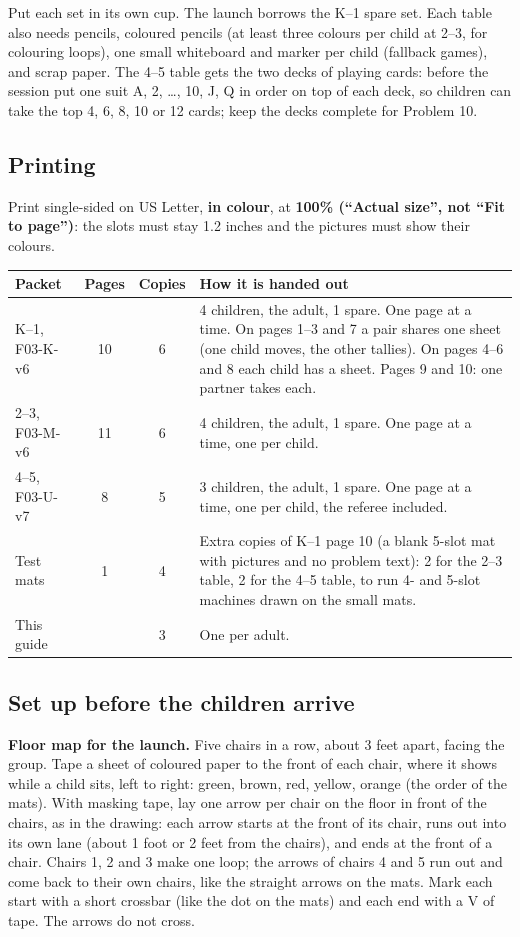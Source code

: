 \documentclass[11pt,letterpaper]{extarticle}
\begin{document}
Put each set in its own cup. The launch borrows the K--1 spare set. Each table also needs pencils, coloured pencils (at least three colours per child at 2--3, for colouring loops), one small whiteboard and marker per child (fallback games), and scrap paper. The 4--5 table gets the two decks of playing cards: before the session put one suit A, 2, \dots, 10, J, Q in order on top of each deck, so children can take the top 4, 6, 8, 10 or 12 cards; keep the decks complete for Problem 10.

\subsection{Printing}
Print single-sided on US Letter, \textbf{in colour}, at \textbf{100\% (``Actual size'', not ``Fit to page'')}: the slots must stay 1.2 inches and the pictures must show their colours.

\begin{tabularx}{\linewidth}{@{}lccX@{}}
\textbf{Packet} & \textbf{Pages} & \textbf{Copies} & \textbf{How it is handed out}\\ \hline
K--1, F03-K-v6 & 10 & 6 & 4 children, the adult, 1 spare. One page at a time. On pages 1--3 and 7 a pair shares one sheet (one child moves, the other tallies). On pages 4--6 and 8 each child has a sheet. Pages 9 and 10: one partner takes each.\\
2--3, F03-M-v6 & 11 & 6 & 4 children, the adult, 1 spare. One page at a time, one per child.\\
4--5, F03-U-v7 & 8 & 5 & 3 children, the adult, 1 spare. One page at a time, one per child, the referee included.\\
Test mats & 1 & 4 & Extra copies of K--1 page 10 (a blank 5-slot mat with pictures and no problem text): 2 for the 2--3 table, 2 for the 4--5 table, to run 4- and 5-slot machines drawn on the small mats.\\
This guide & \pageref*{LastPage} & 3 & One per adult.\\
\end{tabularx}

\subsection{Set up before the children arrive}
\textbf{Floor map for the launch.} Five chairs in a row, about 3 feet apart, facing the group. Tape a sheet of coloured paper to the front of each chair, where it shows while a child sits, left to right: green, brown, red, yellow, orange (the order of the mats). With masking tape, lay one arrow per chair on the floor in front of the chairs, as in the drawing: each arrow starts at the front of its chair, runs out into its own lane (about 1 foot or 2 feet from the chairs), and ends at the front of a chair. Chairs 1, 2 and 3 make one loop; the arrows of chairs 4 and 5 run out and come back to their own chairs, like the straight arrows on the mats. Mark each start with a short crossbar (like the dot on the mats) and each end with a V of tape. The arrows do not cross.
\end{document}
